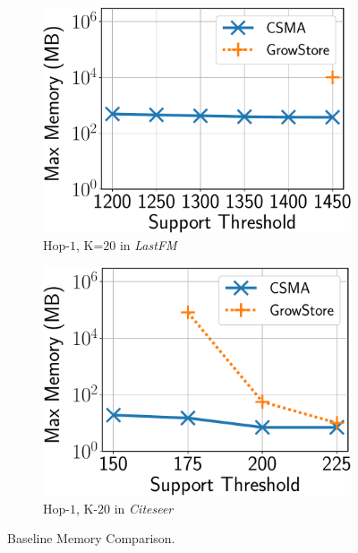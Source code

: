 \begin{figure}
	\vspace{4mm}
	\centering
	\begin{subfigure}[b]{0.25\textwidth}
		\includegraphics[keepaspectratio,scale=0.24]{img2/lastfm/lastfm_mem.pdf}
		\caption{\scriptsize {\sf Hop-$1$, K=$20$} in {\em LastFM}}
		\label{fig:lastfm_mem}
	\end{subfigure}%
	\begin{subfigure}[b]{0.25\textwidth}
		\includegraphics[keepaspectratio,scale=0.24]{img2/citeseer/citeseer_mem.pdf}
		\caption{\scriptsize {\sf Hop-$1$, K-$20$} in {\em Citeseer}}
		\label{fig:citeseer_mem}
	\end{subfigure}%
	\vspace{-2mm}
	\caption{\scriptsize {\sf Baseline Memory Comparison}.}
	\label{fig:mem_comp}
	\vspace{6mm}
\end{figure}

